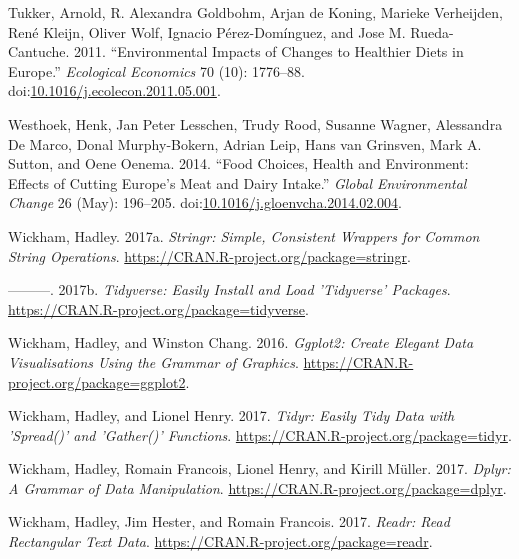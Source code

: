\documentclass[]{book}
\begin{document}
\hypertarget{ref-tukker_environmental_2011}{}
Tukker, Arnold, R. Alexandra Goldbohm, Arjan de Koning, Marieke
Verheijden, René Kleijn, Oliver Wolf, Ignacio Pérez-Domínguez, and Jose
M. Rueda-Cantuche. 2011. ``Environmental Impacts of Changes to Healthier
Diets in Europe.'' \emph{Ecological Economics} 70 (10): 1776--88.
doi:\href{https://doi.org/10.1016/j.ecolecon.2011.05.001}{10.1016/j.ecolecon.2011.05.001}.

\hypertarget{ref-westhoek_food_2014}{}
Westhoek, Henk, Jan Peter Lesschen, Trudy Rood, Susanne Wagner,
Alessandra De Marco, Donal Murphy-Bokern, Adrian Leip, Hans van
Grinsven, Mark A. Sutton, and Oene Oenema. 2014. ``Food Choices, Health
and Environment: Effects of Cutting Europe's Meat and Dairy Intake.''
\emph{Global Environmental Change} 26 (May): 196--205.
doi:\href{https://doi.org/10.1016/j.gloenvcha.2014.02.004}{10.1016/j.gloenvcha.2014.02.004}.

\hypertarget{ref-R-stringr}{}
Wickham, Hadley. 2017a. \emph{Stringr: Simple, Consistent Wrappers for
Common String Operations}.
\url{https://CRAN.R-project.org/package=stringr}.

\hypertarget{ref-R-tidyverse}{}
---------. 2017b. \emph{Tidyverse: Easily Install and Load 'Tidyverse'
Packages}. \url{https://CRAN.R-project.org/package=tidyverse}.

\hypertarget{ref-R-ggplot2}{}
Wickham, Hadley, and Winston Chang. 2016. \emph{Ggplot2: Create Elegant
Data Visualisations Using the Grammar of Graphics}.
\url{https://CRAN.R-project.org/package=ggplot2}.

\hypertarget{ref-R-tidyr}{}
Wickham, Hadley, and Lionel Henry. 2017. \emph{Tidyr: Easily Tidy Data
with 'Spread()' and 'Gather()' Functions}.
\url{https://CRAN.R-project.org/package=tidyr}.

\hypertarget{ref-R-dplyr}{}
Wickham, Hadley, Romain Francois, Lionel Henry, and Kirill Müller. 2017.
\emph{Dplyr: A Grammar of Data Manipulation}.
\url{https://CRAN.R-project.org/package=dplyr}.

\hypertarget{ref-R-readr}{}
Wickham, Hadley, Jim Hester, and Romain Francois. 2017. \emph{Readr:
Read Rectangular Text Data}.
\url{https://CRAN.R-project.org/package=readr}.
\end{document}
